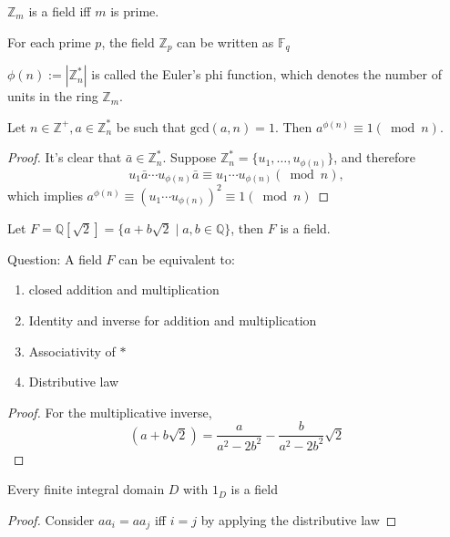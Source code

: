 \begin{corollary}
$\mathbb{Z}_m$ is a field iff $m$ is prime.
\end{corollary}
For each prime $p$, the field $\mathbb{Z}_p$ can be written as $\mathbb{F}_q$
\begin{definition}
$\phi(n):=|\mathbb{Z}_n^*|$ is called the Euler's phi function, which denotes the number of units in the ring $\mathbb{Z}_m$.
\end{definition}
\begin{theorem}
Let $n\in\mathbb{Z}^+,a\in\mathbb{Z}_n^*$ be such that $\mbox{gcd}(a,n)=1$. Then $a^{\phi(n)}\equiv1(\bmod n)$.
\end{theorem}
\begin{proof}
It's clear that $\bar{a}\in\mathbb{Z}_n^*$. Suppose $\mathbb{Z}_n^*=\{u_1,\dots,u_{\phi(n)}\}$, and therefore
\[
u_{1}\bar a\cdots u_{\phi(n)}\bar a\equiv u_1\cdots u_{\phi(n)}(\bmod n),
\]
which implies $a^{\phi(n)}\equiv (u_1\cdots u_{\phi(n)})^2\equiv1(\bmod n)$
\end{proof}
\begin{proposition}
Let $F=\mathbb{Q}[\sqrt{2}]=\{a+b\sqrt{2}\mid a,b\in\mathbb{Q}\}$, then $F$ is a field.
\end{proposition}
Question: A field $F$ can be equivalent to:
\begin{enumerate}
\item
closed addition and multiplication
\item
Identity and inverse for addition and multiplication
\item
Associativity of $*$
\item
Distributive law
\end{enumerate}
\begin{proof}
For the multiplicative inverse,
\[
(a+b\sqrt{2})=\frac{a}{a^2-2b^2}-\frac{b}{a^2-2b^2}\sqrt{2}
\]
\end{proof}
\begin{proposition}
Every finite integral domain $D$ with $1_D$ is a field
\end{proposition}
\begin{proof}
Consider $aa_i=aa_j$ iff $i=j$ by applying the distributive law
\end{proof}

